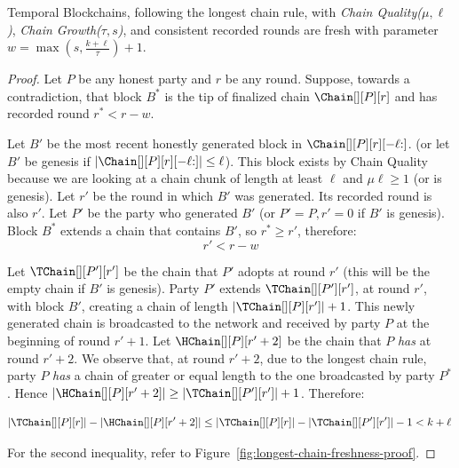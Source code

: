 \begin{theorem}
  Temporal Blockchains, following the longest chain rule,
  with \emph{Chain Quality($\mu,\ell$)},
  \emph{Chain Growth($\tau, s$)},
  and consistent recorded rounds
  are fresh with parameter $w =\max(s, \frac{k + \ell}{\tau}) + 1$.
\end{theorem}
\begin{proof}
  Let $P$ be any honest party and $r$ be any round.
  Suppose, towards a contradiction, that block $B^*$
  is the tip of finalized chain $\Chain[][P][r]$ and has
  recorded round $r^* < r - w$.

  Let $B'$ be the most recent honestly generated block
  in $\Chain[][P][r][{-\ell}{:}]$.
  (or let $B'$ be genesis if $|\Chain[][P][r][{-\ell}{:}]| \leq \ell$).
  This block exists by
  Chain Quality because we are looking at a chain chunk of length at least $\ell$ and
  $\mu\ell \geq 1$ (or is genesis).
  Let $r'$ be the round in which $B'$ was generated.
  Its recorded round is also $r'$.
  Let $P'$ be the party who generated $B'$
  (or $P' = P, r' = 0$ if $B'$ is genesis).
  Block $B^*$ extends a chain that contains $B'$, so $r^* \geq r'$,
  therefore:
  \begin{equation}
    r' < r - w \label{eq:bitcoin-r-bound}
  \end{equation}

  Let $\TChain[][P'][r']$ be the chain that $P'$ adopts at
  round $r'$ (this will be the empty chain if $B'$ is genesis).
  Party $P'$ extends $\TChain[][P'][r']$, at round $r'$, with block $B'$,
  creating a chain of length $|\TChain[][P][r']| + 1$.
  This newly generated chain is broadcasted to the network and
  received by party $P$ at the beginning of round $r' + 1$.
  Let $\HChain[][P][r' + 2]$ be the chain
  that $P$ \emph{has} at round $r' + 2$.
  We observe that, at round $r' + 2$, due to the
  longest chain rule, party $P$ \emph{has} a chain of greater or equal
  length to the one broadcasted by party $P^*$. Hence
  $|\HChain[][P][r' + 2]| \geq |\TChain[][P'][r']| + 1$. Therefore:

  \begin{equation}
    |\TChain[][P][r]| - |\HChain[][P][r' + 2]| \leq
     |\TChain[][P][r]| - |\TChain[][P'][r']| - 1 <
     k + \ell\, \label{eq:bitcoin-contradiction}
  \end{equation}

  For the second inequality, refer to Figure~\ref{fig:longest-chain-freshness-proof}.


\end{proof}
